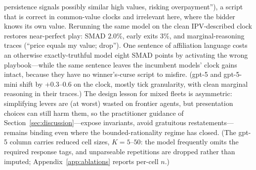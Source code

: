 persistence signals possibly similar high values, risking overpayment''),
a script that is correct in common-value clocks and irrelevant here, where
the bidder knows its own value. Rerunning the same model on the clean
IPV-described clock restores near-perfect play: SMAD $2.0\%$, early exits
$3\%$, and marginal-reasoning traces (``price equals my value; drop'').
One sentence of affiliation language costs an otherwise exactly-truthful
model eight SMAD points by activating the wrong playbook---while the same
sentence leaves the incumbent models' clock gains intact, because they have
no winner's-curse script to misfire. (gpt-5 and gpt-5-mini shift by
$+0.3$--$0.6$ on the clock, mostly tick granularity, with clean marginal
reasoning in their traces.) The design lesson for mixed fleets is asymmetric:
simplifying levers are (at worst) wasted on frontier agents, but
presentation choices can still harm them, so the practitioner guidance of
Section~\ref{sec:discussion}---expose invariants, avoid gratuitous
restatements---remains binding even where the bounded-rationality regime
has closed. (The gpt-5 column carries reduced cell sizes, $K = 5$--$50$:
the model frequently omits the required response tags, and unparseable
repetitions are dropped rather than imputed; Appendix~\ref{app:ablations}
reports per-cell $n$.)

